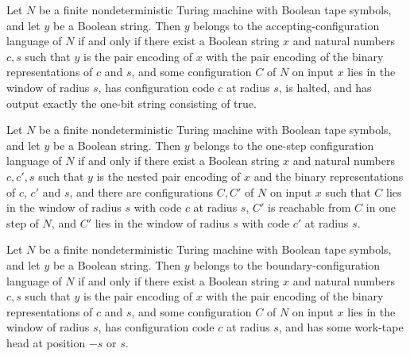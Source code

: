 \begin{lemma}
\label{Complexity.Codec.mem_acceptLang_iff}
\leanok
{}
Let $N$ be a finite nondeterministic Turing machine with Boolean tape symbols, and let
$y$ be a Boolean string. Then $y$ belongs to the accepting-configuration language of
$N$ if and only if there exist a Boolean string $x$ and natural numbers $c,s$ such that
$y$ is the pair encoding of $x$ with the pair encoding of the binary representations of
$c$ and $s$, and some configuration $C$ of $N$ on input $x$ lies in the window of radius
$s$, has configuration code $c$ at radius $s$, is halted, and has output exactly the
one-bit string consisting of true.
\end{lemma}

\begin{lemma}
\label{Complexity.Codec.mem_stepLang_iff}
\leanok
{}
Let $N$ be a finite nondeterministic Turing machine with Boolean tape symbols, and let
$y$ be a Boolean string. Then $y$ belongs to the one-step configuration language of $N$
if and only if there exist a Boolean string $x$ and natural numbers $c,c',s$ such that
$y$ is the nested pair encoding of $x$ and the binary representations of $c$, $c'$ and
$s$, and there are configurations $C,C'$ of $N$ on input $x$ such that $C$ lies in the
window of radius $s$ with code $c$ at radius $s$, $C'$ is reachable from $C$ in one step
of $N$, and $C'$ lies in the window of radius $s$ with code $c'$ at radius $s$.
\end{lemma}

\begin{lemma}
\label{Complexity.Codec.mem_edgeLang_iff}
\leanok
{}
Let $N$ be a finite nondeterministic Turing machine with Boolean tape symbols, and let
$y$ be a Boolean string. Then $y$ belongs to the boundary-configuration language of $N$
if and only if there exist a Boolean string $x$ and natural numbers $c,s$ such that $y$
is the pair encoding of $x$ with the pair encoding of the binary representations of $c$
and $s$, and some configuration $C$ of $N$ on input $x$ lies in the window of radius
$s$, has configuration code $c$ at radius $s$, and has some work-tape head at position
$-s$ or $s$.
\end{lemma}

